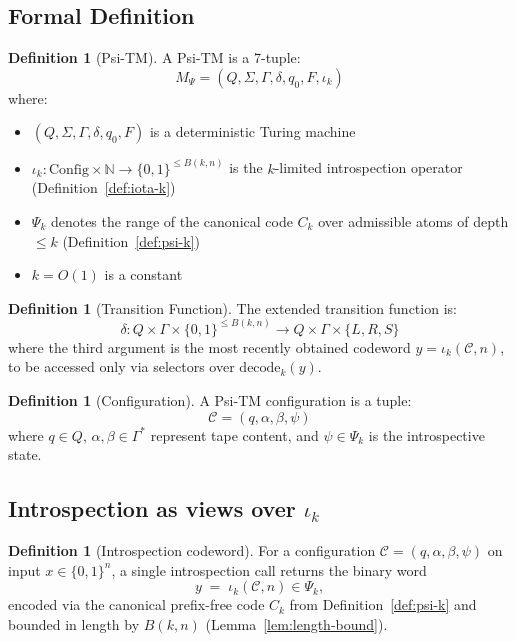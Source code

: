 \documentclass[11pt]{article}
\theoremstyle{definition}
\newtheorem{definition}[theorem]{Definition}
\newcommand{\bits}{\{0,1\}}
\begin{document}
\subsection{Formal Definition}

\begin{definition}[Psi-TM]
A Psi-TM is a 7-tuple:
$$M_\Psi = (Q, \Sigma, \Gamma, \delta, q_0, F, \iota_k)$$
where:
\begin{itemize}
\item $(Q, \Sigma, \Gamma, \delta, q_0, F)$ is a deterministic Turing machine
\item $\iota_k: \mathrm{Config}\times \mathbb{N} \to \{0,1\}^{\le B(k,n)}$ is the $k$-limited introspection operator (Definition~\ref{def:iota-k})
\item $\Psi_k$ denotes the range of the canonical code $C_k$ over admissible atoms of depth $\le k$ (Definition~\ref{def:psi-k})
\item $k = O(1)$ is a constant
\end{itemize}
\end{definition}

\begin{definition}[Transition Function]
The extended transition function is:
$$\delta: Q \times \Gamma \times \bits^{\le B(k,n)} \to Q \times \Gamma \times \{L, R, S\}$$
where the third argument is the most recently obtained codeword $y=\iota_k(\mathcal{C},n)$, to be accessed only via selectors over $\mathrm{decode}_k(y)$.
\end{definition}

\begin{definition}[Configuration]
A Psi-TM configuration is a tuple:
$$\mathcal{C} = (q, \alpha, \beta, \psi)$$
where $q \in Q$, $\alpha, \beta \in \Gamma^*$ represent tape content, and $\psi \in \Psi_k$ is the introspective state.
\end{definition}

\subsection{Introspection as views over $\iota_k$}

\begin{definition}[Introspection codeword]
For a configuration $\mathcal{C}=(q,\alpha,\beta,\psi)$ on input $x\in\bits^n$, a single introspection call returns the binary word
\[
y \;=\; \iota_k(\mathcal{C},n)\in\Psi_k,
\]
encoded via the canonical prefix-free code $C_k$ from Definition~\ref{def:psi-k} and bounded in length by $B(k,n)$ (Lemma~\ref{lem:length-bound}).
\end{definition}
\end{document}
